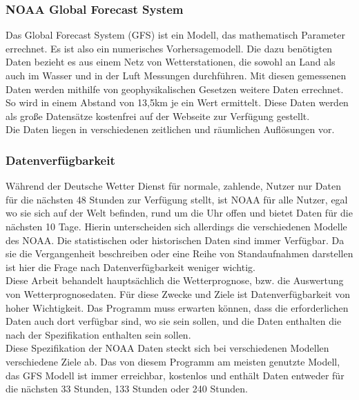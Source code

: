 \subsubsection*{NOAA Global Forecast System} %
Das Global Forecast System (GFS) ist ein Modell, das mathematisch Parameter errechnet.
Es ist also ein numerisches Vorhersagemodell.
Die dazu benötigten Daten bezieht es aus einem Netz von Wetterstationen,
die sowohl an Land als auch im Wasser und in der Luft Messungen durchführen.
Mit diesen gemessenen Daten werden mithilfe von geophysikalischen Gesetzen weitere Daten errechnet.
So wird in einem Abstand von 13,5km je ein Wert ermittelt.
Diese Daten werden als große Datensätze kostenfrei auf
der Webseite  \cite{ncep} zur Verfügung gestellt.\\
Die Daten liegen in verschiedenen zeitlichen und räumlichen Auflösungen vor.

\subsubsection{Datenverfügbarkeit} %
Während der Deutsche Wetter Dienst für normale, zahlende, Nutzer nur Daten
für die nächsten 48 Stunden zur Verfügung stellt, ist NOAA für alle Nutzer,
egal wo sie sich auf der Welt befinden, rund um die Uhr offen und bietet Daten
für die nächsten 10 Tage. Hierin unterscheiden sich allerdings die verschiedenen
Modelle des NOAA. Die statistischen oder historischen Daten sind immer Verfügbar.
Da sie die Vergangenheit beschreiben oder eine Reihe von Standaufnahmen darstellen
ist hier die Frage nach Datenverfügbarkeit weniger wichtig.\\
Diese Arbeit behandelt hauptsächlich die Wetterprognose, bzw. die Auswertung
von Wetterprognosedaten. Für diese Zwecke und Ziele ist Datenverfügbarkeit von
hoher Wichtigkeit. Das Programm muss erwarten können,
dass die erforderlichen Daten auch
dort verfügbar sind, wo sie sein sollen,
und die Daten enthalten die nach der
Spezifikation enthalten sein sollen.\\
Diese Spezifikation der NOAA Daten steckt sich bei verschiedenen Modellen
verschiedene Ziele ab.
Das von diesem Programm am meisten genutzte Modell,
das GFS Modell ist immer erreichbar,
kostenlos und enthält Daten entweder für die nächsten 33 Stunden,
133 Stunden oder 240 Stunden.

